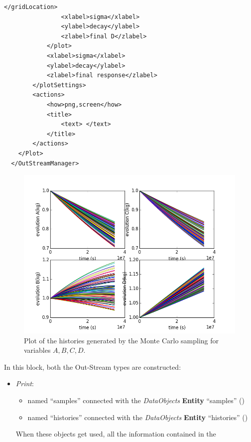 \begin{enumerate}
\begin{lstlisting}[style=XML,morekeywords={arg,extension,pauseAtEnd,overwrite}]
                </gridLocation>
                <xlabel>sigma</xlabel>
                <ylabel>decay</ylabel>
                <zlabel>final D</zlabel>
            </plot>
            <xlabel>sigma</xlabel>
            <ylabel>decay</ylabel>
            <zlabel>final response</zlabel>
        </plotSettings>
        <actions>
            <how>png,screen</how>
            <title>
                <text> </text>
            </title>
        </actions>
    </Plot>
  </OutStreamManager>
\end{lstlisting}
 \begin{figure}[h!]
  \centering
  \includegraphics[scale=0.7]{pics/MC_histories.png}
  \caption{Plot of the histories generated by the Monte Carlo sampling for variables $A,B,C,D$.}
  \label{fig:historiesMCPlotLine}
 \end{figure}
  In this block, both the Out-Stream types are constructed: 
  \begin{itemize}
    \item \textit{Print}: 
     \begin{itemize}
       \item named ``samples'' connected with the \textit{DataObjects} \textbf{Entity} ``samples'' 
                ()
       \item named ``histories'' connected with the \textit{DataObjects} \textbf{Entity} ``histories'' ()          
     \end{itemize}         
      When these objects get used, all the information contained in the 

\end{itemize}
\end{enumerate}
